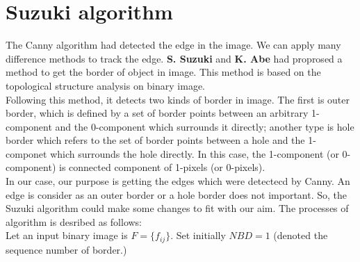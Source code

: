 \section{Suzuki algorithm}
The Canny algorithm had detected the edge in the image. We can apply many difference methods to track the edge. \textbf{S. Suzuki} and \textbf{K. Abe}\cite{suzuki1985topological} had proprosed a method to get the border of object in image. This method is based on the topological structure analysis on binary image.\\[0.2cm]
Following this method, it detects two kinds of border in image. The first is outer border, which is defined by a set of border points between an arbitrary 1-component and the 0-component which surrounds it directly; another type is hole border which refers to the set of border points between a hole and the 1-componet which surrounds the hole directly. In this case, the 1-component (or 0-component) is connected component of 1-pixels (or 0-pixels).\\[0.2cm]
In our case, our purpose is getting the edges which were detectecd by Canny\cite{canny1986computational}. An edge is consider as an outer border or a hole border does not important. So, the Suzuki algorithm could make some changes to fit with our aim. The processes of algorithm is desribed as follows:\\[0.2cm]
Let an input binary image is \textbf{$F=\{f_{ij}\}$}. Set initially $NBD = 1$ (denoted the sequence number of border.)
